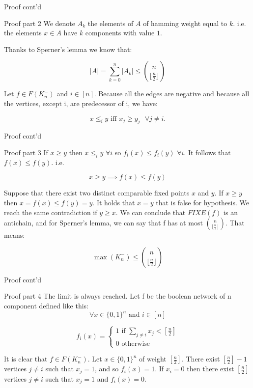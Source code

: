 \documentclass{beamer}
\newcommand{\floor}[1]{\lfloor #1 \rfloor}
\begin{document}
\begin{frame}{Proof cont'd}
    \justifying
    \begin{block}{Proof part 2}
    We denote $A_k$ the elements of $A$ of hamming weight equal to $k$. i.e. the elements $x \in A$ have $k$ components with value $1$.
    
    
    

    Thanks to Sperner's lemma we know that:
    
    \[
            |A| = \sum_{k=0}^n |A_k| \leq \binom{n}{\floor{\frac{n}{2}}}
    \]
    
    Let $f \in F(K_n^-)$ and $i \in [n]$. Because all the edges are negative and because all the vertices, except i, are predecessor of i, we have: 
    
    \[
    x \leq_i y \text{ iff } x_j \geq y_j \text{ } \forall j \neq i.
    \]
    
    \end{block}
\end{frame}

\begin{frame}{Proof cont'd}
\justifying
\begin{block}{Proof part 3}
If $x \geq y$ then $x \leq_i y$ $ \forall i$ so $f_i(x) \leq f_i(y)$ $ \forall i$. It follows that $f(x) \leq f(y)$. i.e.

\[
    x \geq y \implies f(x) \leq f(y)
\]

Suppose that there exist two distinct comparable fixed points $x$ and $y$. If $x \geq y$ then $x = f(x) \leq f(y) = y$. It holds that $x = y$ that is false for hypothesis. We reach the same contradiction if $y \geq x$. We can conclude that $FIXE(f)$ is an antichain, and for Sperner's lemma, we can say that f has at most $\binom{n}{\floor{\frac{n}{2}}}$. That means:

\[
\max(K_n^-) \leq \binom{n}{\floor{\frac{n}{2}}}
\]

    
\end{block}
\end{frame}

\begin{frame}{Proof cont'd}
\justifying
\begin{block}{Proof part 4}
    The limit is always reached. Let f be the boolean network of n component defined like this:
    \[
        \forall x \in \{0,1\}^n \text{ and } i \in [n]
    \]
    
    \[
    f_i(x) = 
    \begin{cases}
        1 \text{ if } \sum_{j \neq i}x_j < [\frac{n}{2}] \\
        0 \text{ otherwise }
    \end{cases}
    \]
    
    
    It is clear that $f \in F(K_n^-)$. Let $x \in \{0, 1\}^n$ of weight $[\frac {n}{2}]$. There exist $[\frac {n}{2}] - 1$ vertices $j \neq i$ such that $x_j = 1$, and so $f_i(x) = 1$. If $x_i = 0$ then there exist $[\frac {n}{2}]$ vertices $j \neq i$ such that $x_j = 1$ and $f_i(x) = 0$.
    
    \end{block}
\end{frame}
\end{document}

